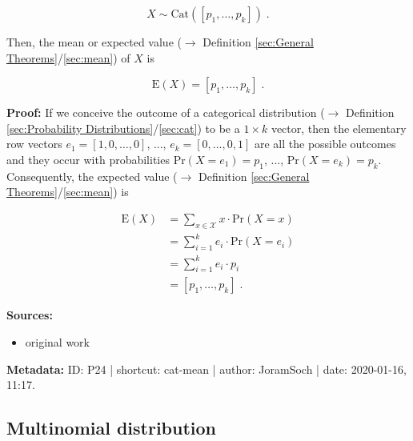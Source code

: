 \documentclass[a4paper,12pt,twoside]{book}
\begin{document}
\begin{equation} \label{eq:cat-mean-cat}
X \sim \mathrm{Cat}(\left[p_1, \ldots, p_k \right]) \; .
\end{equation}

Then, the mean or expected value ($\rightarrow$ Definition \ref{sec:General Theorems}/\ref{sec:mean}) of $X$ is

\begin{equation} \label{eq:cat-mean-cat-mean}
\mathrm{E}(X) = \left[p_1, \ldots, p_k \right] \; .
\end{equation}


\vspace{1em}
\textbf{Proof:} If we conceive the outcome of a categorical distribution ($\rightarrow$ Definition \ref{sec:Probability Distributions}/\ref{sec:cat}) to be a $1 \times k$ vector, then the elementary row vectors $e_1 = \left[1, 0, \ldots, 0 \right]$, ..., $e_k = \left[0, \ldots, 0, 1 \right]$ are all the possible outcomes and they occur with probabilities $\mathrm{Pr}(X = e_1) = p_1$, ..., $\mathrm{Pr}(X = e_k) = p_k$. Consequently, the expected value ($\rightarrow$ Definition \ref{sec:General Theorems}/\ref{sec:mean}) is

\begin{equation} \label{eq:cat-mean-cat-mean-qed}
\begin{split}
\mathrm{E}(X) &= \sum_{x \in \mathcal{X}} x \cdot \mathrm{Pr}(X = x) \\
&= \sum_{i=1}^k e_i \cdot \mathrm{Pr}(X = e_i) \\
&= \sum_{i=1}^k e_i \cdot p_i \\
&= \left[p_1, \ldots, p_k \right] \; .
\end{split}
\end{equation}


\vspace{1em}
\textbf{Sources:}
\begin{itemize}
\item original work\end{itemize}


\vspace{1em}
\textbf{Metadata:} ID: P24 | shortcut: cat-mean | author: JoramSoch | date: 2020-01-16, 11:17.
\vspace{1em}



\subsection{Multinomial distribution}
\end{document}
